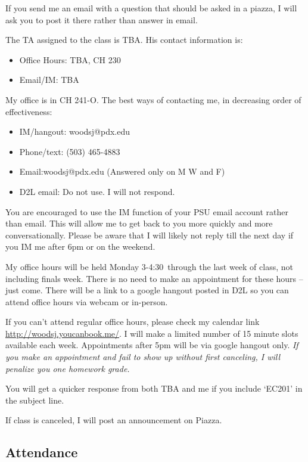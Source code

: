 \documentclass[letterpaper,10pt]{article}
\newcommand{\Office}{Monday 3-4:30}
\begin{document}
If you send me an email with a question that should be asked in a piazza, I
will ask you to post it there rather than answer in email.

The TA assigned to the class is TBA. 
 His contact information is:
 \begin{itemize}
 \item Office Hours: TBA, CH 230

 \item Email/IM: TBA

 \end{itemize}


My office is in CH 241-O.  The best ways of contacting me, in
decreasing order of effectiveness:
\begin{itemize}

\item IM/hangout: woodsj@pdx.edu

\item Phone/text: (503) 465-4883
\item Email:woodsj@pdx.edu (Answered only on M W and F)
\item D2L email: Do not use.  I will not respond.
\end{itemize}

You are encouraged to use the IM function of your PSU email account rather than email. This will allow me to get back to you more quickly and more conversationally. Please be aware that I will likely not reply till the next day if you IM me after 6pm or on the weekend.  

My office hours will be held \Office ~through the last week of class, not including finals week. There is no need to make an appointment for these hours -- just come.  There will be a link to a google hangout posted in D2L so you can attend office hours via webcam or in-person.

If you can't attend regular office hours, please check my calendar link \url{http://woodsj.youcanbook.me/}. I will make a limited number of 15 minute slots available each week. Appointments after 5pm will be via google hangout only. \emph{If you make an appointment and fail to show up without first canceling, I will penalize you one homework grade.}  


You will get a quicker response from both TBA and me if you include `EC201' in the subject line.


If class is canceled, I will post an announcement on Piazza.

\subsection{Attendance}
\end{document}
